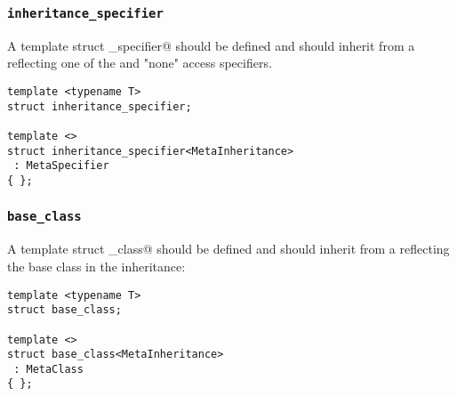 \subsubsection{\texttt{inheritance\_specifier}}

A template struct \verb@inheritance_specifier@ should be defined and should inherit from
a  reflecting one of the \verb@virtual@ and "none" access specifiers.

\begin{verbatim}
template <typename T>
struct inheritance_specifier;

template <>
struct inheritance_specifier<MetaInheritance>
 : MetaSpecifier
{ };
\end{verbatim}

\subsubsection{\texttt{base\_class}}

A template struct \verb@base_class@ should be defined and should inherit from
a  reflecting the base class in the inheritance:

\begin{verbatim}
template <typename T>
struct base_class;

template <>
struct base_class<MetaInheritance>
 : MetaClass
{ };
\end{verbatim}

